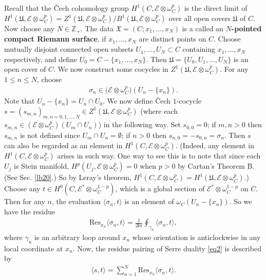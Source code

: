\documentclass[12pt,a4paper,notitlepage]{report}
\theoremstyle{definition}
\theoremstyle{plain}
\newcommand{\fk}{\mathfrak}
\newcommand{\mc}{\mathcal}
\newcommand{\Res}{\mathrm{Res}}
\newcommand{\bk}[1]{\langle {#1}\rangle}
\newcommand{\scr}{\mathscr}
\newcommand{\im}{\mathbf{i}}
\numberwithin{equation}{section}
\begin{document}
Recall that the \v{C}ech cohomology group $H^1(C,\scr E\otimes \omega_C^p)$ is the direct limit of $H^1(\fk U,\scr E\otimes \omega_C^p)={Z^1(\fk U,\scr E\otimes \omega_C^p)}/{B^1(\fk U,\scr E\otimes \omega_C^p)}$ over all open covers $\fk U$ of $C$. Now choose any $N\in\mathbb Z_+$.  The data $\fk X=(C;x_1,\dots,x_N)$ is a called an \textbf{$N$-pointed compact Riemann surface}, if $x_1,\dots,x_N$ are distinct points on $C$. Choose mutually disjoint connected open subsets $U_1,\dots,U_N\subset C$ containing $x_1,\dots,x_N$ respectively, and define $U_0=C-\{x_1,\dots,x_N\}$. Then $\fk U=\{U_0,U_1,\dots,U_N\}$ is an open cover of $C$.  We now construct some cocycles in $Z^{1}(\fk U,\scr E\otimes \omega_C^p)$. For any $1\leq n\leq N$, choose
\begin{align*}
\sigma_n\in\mc (\scr E\otimes\omega_C^p)(U_n-\{x_n\}).
\end{align*}
Note that $U_n-\{x_n\}=U_n\cap U_0$. We now define \v{C}ech $1$-cocycle $s=(s_{m,n})_{m,n=0,1,\dots,N }\in Z^{1}(\fk U,\scr E\otimes \omega_C^p)$ (where each $s_{m,n}\in (\scr E\otimes\omega_C^p)(U_m\cap U_n)$) in the following way. Set $s_{0,0}=0$; if $m,n> 0$ then $s_{m,n}$ is not defined since $U_m\cap U_n=\emptyset$; if $n>0$ then $s_{n,0}=-s_{0,n}=\sigma_n$. Then $s$ can also be regarded as an element in $H^1(C,\scr E\otimes \omega_C^p)$. (Indeed, any element in $H^1(C,\scr E\otimes \omega_C^p)$ arises in such way. One way to see this is to note that since each $U_j$ is Stein manifold, $H^p(U_j,\scr E\otimes\omega_C^p)=0$ when $p>0$ by Cartan's Theorem B. (See Sec. \ref{lb20}.) So by Leray's theorem, $H^1(C,\scr E\otimes \omega_C^p)=H^1(\fk U,\scr E\otimes \omega_C^p)$.)  Choose any $t\in H^0(C,\scr E^*\otimes\omega_C^{1-p})$, which is a global section of $\scr E^*\otimes\omega_C^{1-p}$ on $C$. Then for any $n$, the evaluation $\bk{\sigma_n,t}$ is an element of $\omega_C(U_n-\{x_n\})$. So we have the residue
\begin{align}\label{eq1}
\Res_{x_n}\bk{\sigma_n,t}=\frac{1}{2\im\pi}\oint_{\gamma_n}\bk{\sigma_n,t},
\end{align}
where $\gamma_n$ is an arbitrary loop around $x_n$ whose orientation is anticlockwise in any local coordinate at $x_n$.  Now, the residue pairing of Serre duality \eqref{eq2} is described by
\begin{align}
\bk{s,t}=\sum_{n=1}^N\Res_{x_n}\bk{\sigma_n,t}.
\end{align}
\end{document}
